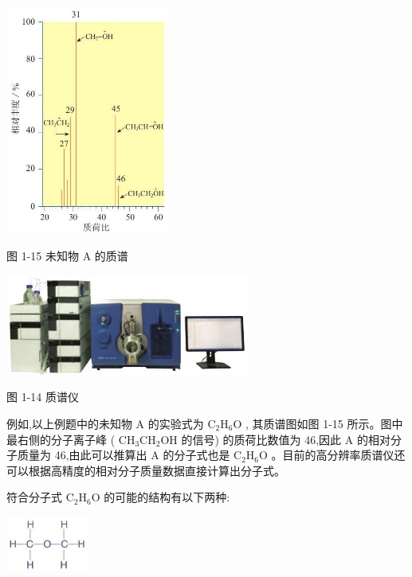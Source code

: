 \documentclass[10pt]{article}
\begin{document}
\begin{center}
\includegraphics[max width=0.4\textwidth]{images/0190efc5-b58a-7c43-bfb0-e0a030df9cfd_23_825422.jpg}
\end{center}

图 1-15 未知物 \(\mathrm{A}\) 的质谱

\begin{center}
\includegraphics[max width=0.6\textwidth]{images/0190efc5-b58a-7c43-bfb0-e0a030df9cfd_23_323426.jpg}
\end{center}

图 1-14 质谱仪

例如,以上例题中的未知物 \(\mathrm{A}\) 的实验式为 \({\mathrm{C}}_{2}{\mathrm{H}}_{6}\mathrm{O}\) , 其质谱图如图 1-15 所示。图中最右侧的分子离子峰 ( \({\mathrm{{CH}}}_{3}{\mathrm{{CH}}}_{2}\mathrm{{OH}}\) 的信号) 的质荷比数值为 46,因此 \(\mathrm{A}\) 的相对分子质量为 46,由此可以推算出 \(\mathrm{A}\) 的分子式也是 \({\mathrm{C}}_{2}{\mathrm{H}}_{6}\mathrm{O}\) 。目前的高分辨率质谱仪还可以根据高精度的相对分子质量数据直接计算出分子式。

符合分子式 \({\mathrm{C}}_{2}{\mathrm{H}}_{6}\mathrm{O}\) 的可能的结构有以下两种:

\begin{center}
\includegraphics[max width=0.2\textwidth]{images/0190efc5-b58a-7c43-bfb0-e0a030df9cfd_23_842496.jpg}
\end{center}
\end{document}
